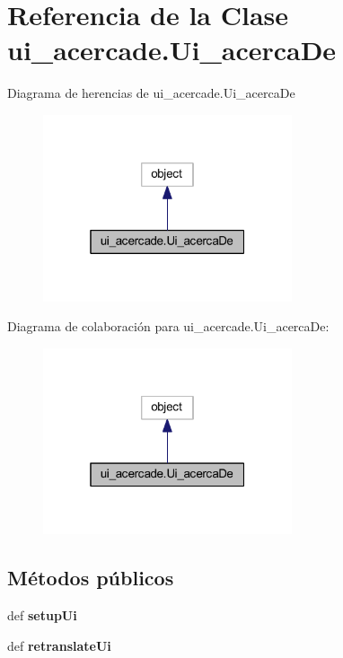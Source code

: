 \section{Referencia de la Clase ui\-\_\-acercade.\-Ui\-\_\-acerca\-De}
\label{classui__acercade_1_1_ui__acerca_de}


Diagrama de herencias de ui\-\_\-acercade.\-Ui\-\_\-acerca\-De\nopagebreak
\begin{figure}[H]
\begin{center}
\leavevmode
\includegraphics[width=208pt]{classui__acercade_1_1_ui__acerca_de__inherit__graph}
\end{center}
\end{figure}


Diagrama de colaboración para ui\-\_\-acercade.\-Ui\-\_\-acerca\-De\-:\nopagebreak
\begin{figure}[H]
\begin{center}
\leavevmode
\includegraphics[width=208pt]{classui__acercade_1_1_ui__acerca_de__coll__graph}
\end{center}
\end{figure}
\subsection*{Métodos públicos}
\begin{DoxyCompactItemize}
\item 
def {\bfseries setup\-Ui}\label{classui__acercade_1_1_ui__acerca_de_a2fce16d29c65ead27ca1123784d6ee8c}

\item 
def {\bfseries retranslate\-Ui}\label{classui__acercade_1_1_ui__acerca_de_af7f3107643db084e29df61257d791125}

\end{DoxyCompactItemize}
